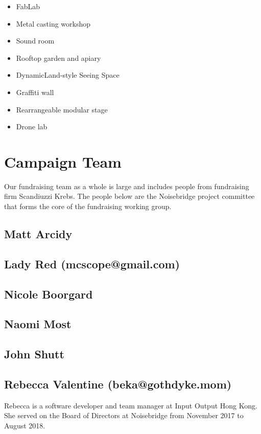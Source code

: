 \documentclass[12pt]{article}
\begin{document}
\begin{itemize}
    \item FabLab
    \item Metal casting workshop
    \item Sound room
    \item Rooftop garden and apiary
    \item DynamicLand-style Seeing Space
    \item Graffiti wall
    \item Rearrangeable modular stage
    \item Drone lab
\end{itemize}





\section{Campaign Team}

Our fundraising team as a whole is large and includes people from fundraising firm Scandiuzzi Krebs. The people below are the Noisebridge project committee that forms the core of the fundraising working group.

\subsection{Matt Arcidy}

\subsection{Lady Red (mcscope@gmail.com)}

\subsection{Nicole Boorgard}

\subsection{Naomi Most}

\subsection{John Shutt}

\subsection{Rebecca Valentine (beka@gothdyke.mom)} Rebecca is a software developer and team manager at Input Output Hong Kong. She served on the Board of Directors at Noisebridge from November 2017 to August 2018.
\end{document}
